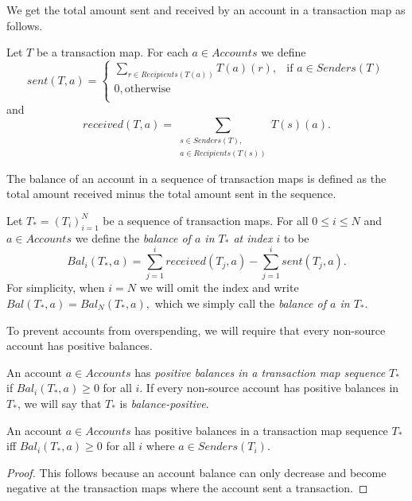 We get the total amount sent and received by an account in a transaction map as follows.

\begin{defn}
Let \(T\) be a transaction map. For each \(a \in Accounts\) we define \[sent(T,a) = \begin{cases}
  \sum_{r \in Recipients(T(a))} T(a)(r), & \text{if } a \in Senders(T) \\
  0, \text{otherwise} \\
  \end{cases}\] and
  \[received(T,a) = \sum_{\substack{s \in Senders(T), \\
  a \in Recipients(T(s))}} T(s)(a).\]
\end{defn}

The balance of an account in a sequence of transaction maps is defined as the total amount received minus the total amount sent in the sequence.

\begin{defn}[Balance]
  Let \(T_* = (T_i)_{i=1}^N\) be a sequence of transaction maps. For all \(0 \leq i \leq N\) and \(a \in Accounts\) we define the \emph{balance of \(a\) in \(T_*\) at index \(i\)} to be \[Bal_i(T_*,a) = \sum_{j=1}^i received(T_j,a) - \sum_{j=1}^i sent(T_j,a).\] For simplicity, when \(i=N\) we will omit the index and write \(Bal(T_*,a) = Bal_N(T_*,a),\) which we simply call the \emph{balance of \(a\) in \(T_*\)}.
\end{defn}

To prevent accounts from overspending, we will require that every non-source account has positive balances.

\begin{defn}
  An account \(a \in Accounts\) has \emph{positive balances in a transaction map sequence} \(T_*\) if \(Bal_i(T_*,a) \geq 0\) for all \(i\). If every non-source account has positive balances in \(T_*\), we will say that \(T_*\) is \emph{balance-positive}.
\end{defn}

\begin{prop}\label{theorem:only-need-to-check-for-positive-balance-when-sending-transactions}
  An account \(a \in Accounts\) has positive balances in a transaction map sequence \(T_*\) iff \(Bal_i(T_*,a) \geq 0\) for all \(i\) where \(a \in Senders(T_i)\).
\end{prop}

\begin{proof}
  This follows because an account balance can only decrease and become negative at the transaction maps where the account sent a transaction.
\end{proof}

